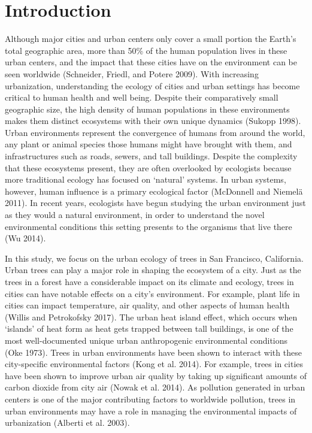 \documentclass[fleqn,10pt,lineno]{wlpeerj} %
\begin{document}
\hypertarget{introduction}{%
\section*{Introduction}\label{introduction}}

Although major cities and urban centers only cover a small portion the Earth's total geographic area, more than 50\% of the human population lives in these urban centers, and the impact that these cities have on the environment can be seen worldwide (Schneider, Friedl, and Potere 2009). With increasing urbanization, understanding the ecology of cities and urban settings has become critical to human health and well being. Despite their comparatively small geographic size, the high density of human populations in these environments makes them distinct ecosystems with their own unique dynamics (Sukopp 1998). Urban environments represent the convergence of humans from around the world, any plant or animal species those humans might have brought with them, and infrastructures such as roads, sewers, and tall buildings. Despite the complexity that these ecosystems present, they are often overlooked by ecologists because more traditional ecology has focused on `natural' systems. In urban systems, however, human influence is a primary ecological factor (McDonnell and Niemelä 2011). In recent years, ecologists have begun studying the urban environment just as they would a natural environment, in order to understand the novel environmental conditions this setting presents to the organisms that live there (Wu 2014).

In this study, we focus on the urban ecology of trees in San Francisco, California. Urban trees can play a major role in shaping the ecosystem of a city. Just as the trees in a forest have a considerable impact on its climate and ecology, trees in cities can have notable effects on a city's environment. For example, plant life in cities can impact temperature, air quality, and other aspects of human health (Willis and Petrokofsky 2017). The urban heat island effect, which occurs when `islands' of heat form as heat gets trapped between tall buildings, is one of the most well-documented unique urban anthropogenic environmental conditions (Oke 1973). Trees in urban environments have been shown to interact with these city-specific environmental factors (Kong et al. 2014). For example, trees in cities have been shown to improve urban air quality by taking up significant amounts of carbon dioxide from city air (Nowak et al. 2014). As pollution generated in urban centers is one of the major contributing factors to worldwide pollution, trees in urban environments may have a role in managing the environmental impacts of urbanization (Alberti et al. 2003).
\end{document}
